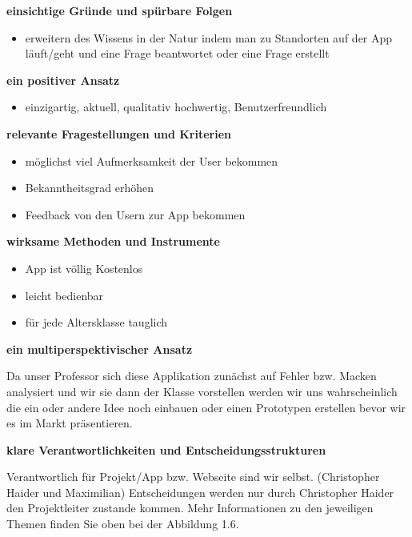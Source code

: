 \textbf {einsichtige Gründe und spürbare Folgen}
\begin{itemize}
		\item erweitern des Wissens in der Natur indem man zu Standorten auf der App läuft/geht und eine Frage beantwortet oder eine Frage erstellt
	\end{itemize}




\textbf {ein positiver Ansatz}

\begin{itemize}
		\item einzigartig, aktuell, qualitativ hochwertig, Benutzerfreundlich
\end{itemize}




\textbf {relevante Fragestellungen und Kriterien}

\begin{itemize}
		\item möglichst viel Aufmerksamkeit der User bekommen
		\item Bekanntheitsgrad erhöhen
		\item Feedback von den Usern zur App bekommen
	\end{itemize}




\textbf {wirksame Methoden und Instrumente}

\begin{itemize}
		\item App ist völlig Kostenlos
		\item leicht bedienbar
		\item für jede Altersklasse tauglich
\end{itemize}


\textbf {ein multiperspektivischer Ansatz}

Da unser Professor sich diese Applikation zunächst auf Fehler bzw. Macken analysiert und wir sie dann der Klasse vorstellen werden  wir uns wahrscheinlich die ein oder andere Idee noch einbauen oder einen Prototypen erstellen bevor wir es im Markt präsentieren.

\textbf {klare Verantwortlichkeiten und Entscheidungsstrukturen}


Verantwortlich für Projekt/App bzw. Webseite sind wir selbst. (Christopher Haider und Maximilian)
Entscheidungen werden nur durch Christopher Haider den Projektleiter zustande kommen.
Mehr Informationen zu den jeweiligen Themen finden Sie oben bei der Abbildung 1.6.


